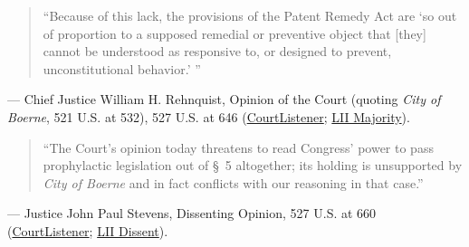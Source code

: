 \documentclass[12pt]{article}
\begin{document}
\begin{quote}
``Because of this lack, the provisions of the Patent Remedy Act are `so out of proportion to a supposed remedial or preventive object that [they] cannot be understood as responsive to, or designed to prevent, unconstitutional behavior.' ''
\end{quote}
\noindent --- Chief Justice William H. Rehnquist, Opinion of the Court (quoting \textit{City of Boerne}, 521 U.S. at 532), 527 U.S. at 646 (\href{https://www.courtlistener.com/opinion/118316/florida-prepaid-postsecondary-education-expense-board-v-college-savings/}{CourtListener}; \href{https://www.law.cornell.edu/supct/html/98-531.ZO.html}{LII Majority}).

\begin{quote}
``The Court's opinion today threatens to read Congress' power to pass prophylactic legislation out of \S~5 altogether; its holding is unsupported by \textit{City of Boerne} and in fact conflicts with our reasoning in that case.''
\end{quote}
\noindent --- Justice John Paul Stevens, Dissenting Opinion, 527 U.S. at 660 (\href{https://www.courtlistener.com/opinion/118316/florida-prepaid-postsecondary-education-expense-board-v-college-savings/}{CourtListener}; \href{https://www.law.cornell.edu/supct/html/98-531.ZD.html}{LII Dissent}).
\end{document}
